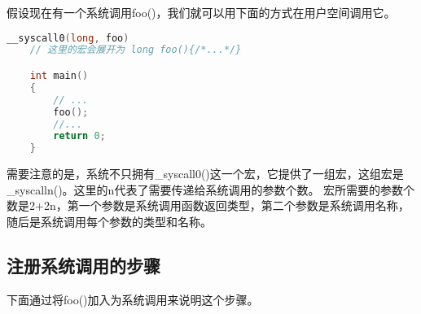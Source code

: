\documentclass[a4paper,left=2.5cm,right=2.5cm,11pt]{article}
\begin{document}
	假设现在有一个系统调用foo()，我们就可以用下面的方式在用户空间调用它。
	\begin{lstlisting}[language=C]
	__syscall0(long, foo)
	// 这里的宏会展开为 long foo(){/*...*/}

	int main()
	{
		// ...
		foo();
		//...
		return 0;
	}
	\end{lstlisting}

	需要注意的是，系统不只拥有\_syscall0()这一个宏，它提供了一组宏，这组宏是\_syscalln()。这里的n代表了需要传递给系统调用的参数个数。
	宏所需要的参数个数是2+2n，第一个参数是系统调用函数返回类型，第二个参数是系统调用名称，随后是系统调用每个参数的类型和名称。

\subsection{注册系统调用的步骤}
	下面通过将foo()加入为系统调用来说明这个步骤。
\end{document}
